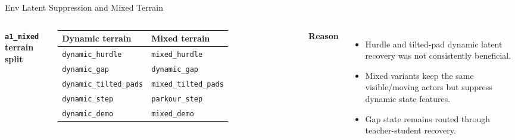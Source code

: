 \documentclass[aspectratio=169,xcolor=dvipsnames]{beamer}
\begin{document}
\begin{frame}{Env Latent Suppression and Mixed Terrain}
    \begin{columns}[T,onlytextwidth]
        \textbf{\texttt{a1\_mixed} terrain split}
        \begin{table}
            \centering
            \scriptsize
            \begin{tabular}{ll}
                \toprule
                Dynamic terrain & Mixed terrain \\
                \midrule
                \texttt{dynamic\_hurdle}       & \texttt{mixed\_hurdle} \\
                \texttt{dynamic\_gap}          & {\color{gray!60}\texttt{dynamic\_gap}} \\
                \texttt{dynamic\_tilted\_pads} & \texttt{mixed\_tilted\_pads} \\
                \texttt{dynamic\_step}         & {\color{gray}\texttt{parkour\_step}} \\
                \texttt{dynamic\_demo}         & {\color{gray!60}\texttt{mixed\_demo}} \\
                \bottomrule
            \end{tabular}
        \end{table}

        \textbf{Reason}
        \begin{itemize}
            \setlength{\itemsep}{0.35em}
            \item Hurdle and tilted-pad dynamic latent recovery was not consistently beneficial.
            \item Mixed variants keep the same visible/moving actors but suppress dynamic state features.
            \item Gap state remains routed through teacher-student recovery.
        \end{itemize}
    \end{columns}
\end{frame}

\end{document}
